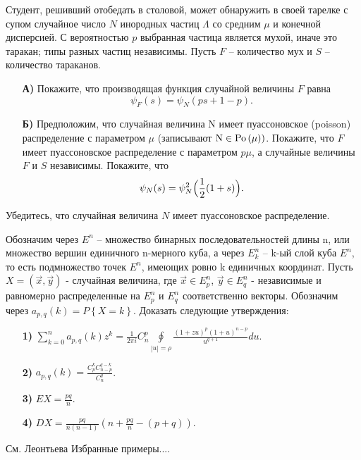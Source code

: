\begin{problem}
Студент, решивший отобедать в 
столовой, может обнаружить в своей тарелке с супом случайное число $N$ 
инородных частиц $\Lambda $ со средним $\mu $ и конечной дисперсией. С 
вероятностью $p$ выбранная частица является мухой, иначе это таракан; типы 
разных частиц независимы. Пусть $F$ -- количество мух и $S$ -- количество тараканов.

\begin{enumerate}
\item[\textbf{А)}] Покажите, что производящая функция случайной величины $F$ равна
\[
\psi _F (s)=\psi _N (ps+1-p).
\]

\item[\textbf{Б)}] Предположим, что случайная величина N имеет пуассоновское 
(poisson) распределение с параметром $\mu $ (записывают $\mbox{N}\in 
\mathrm{Po}\left( \mu \right))$. Покажите, что $F$ имеет пуассоновское распределение с 
параметром $p\mu $, а случайные величины $F$ и $S$ независимы. Покажите, что
\[
\psi _N (s)=\psi _N^2 \Bigl( {\frac{1}{2}(1+s)} \Bigr).
\]
\end{enumerate}
Убедитесь, что случайная величина $N$ имеет пуассоновское распределение.
\end{problem}

\begin{problem} 
Обозначим через $E^n$ -- множество бинарных последовательностей длины n, или множество вершин 
единичного n-мерного куба, а через $E_k^n $ -- k-ый слой куба $E^n$, то есть 
подмножество точек $E^n$, имеющих ровно k единичных координат. Пусть 
$X=\left( {\vec {x},\vec {y}} \right)$ - случайная величина, где $\vec 
{x}\in E_p^n $, $\vec {y}\in E_q^n $ - независимые и равномерно 
распределенные на $E_p^n $ и $E_q^n $ соответственно векторы. Обозначим 
через $a_{p,q} (k)=P\left\{ {X=k} \right\}$. Доказать следующие утверждения:

\begin{enumerate}
\item[\textbf{1)}] $\sum\limits_{k=0}^n {a_{p,q} (k)z^k} =\frac{1}{2\pi i}C_n^p 
\oint\limits_{\left| u \right|=\rho } 
{\frac{(1+zu)^p(1+u)^{n-p}}{u^{q+1}}du} $.

\item[\textbf{2)}] $a_{p,q} (k)=\frac{C_p^k C_{n-p}^{q-k} }{C_n^q }$.

\item[\textbf{3)}] $EX=\frac{pq}{n}$.

\item[\textbf{4)}] $DX=\frac{pq}{n(n-1)}\left( {n+\frac{pq}{n}-(p+q)} \right)$.
\end{enumerate}
\end{problem}

\begin{fixme}
См. Леонтьева Избранные примеры.... 
\end{fixme}








